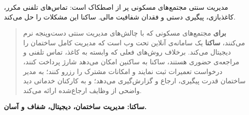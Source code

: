 

\vspace{0.5cm}

مدیریت سنتی مجتمع‌های مسکونی پر از اصطکاک است:
تماس‌های تلفنی مکرر، کاغذبازی، پیگیری دستی و فقدان شفافیت مالی.
ساکنا این مشکلات را حل می‌کند.

\vspace{0.8cm}

\begin{quote}
\textbf{برای} مجتمع‌های مسکونی که با چالش‌های مدیریت سنتی دست‌وپنجه نرم می‌کنند،
\textbf{ساکنا} یک سامانه‌ی آنلاین تحت وب است که مدیریت کامل ساختمان را دیجیتال می‌کند.
برخلاف روش‌های فعلی که وابسته به کاغذ، تماس تلفنی و مراجعه‌ی حضوری هستند،
ساکنا به ساکنین امکان می‌دهد شارژ پرداخت کنند، درخواست تعمیرات ثبت نمایند
و امکانات مشترک را رزرو کنند؛
به مدیر ساختمان قدرت پیگیری، ارجاع و گزارش‌گیری می‌دهد؛
و به کارکنان خدماتی دید واضحی از وظایف ارجاع‌شده ارائه می‌کند.
\end{quote}

\vspace{1cm}

\begin{center}
{\Large\textbf{ساکنا: مدیریت ساختمان، دیجیتال، شفاف و آسان.}}
\end{center}
